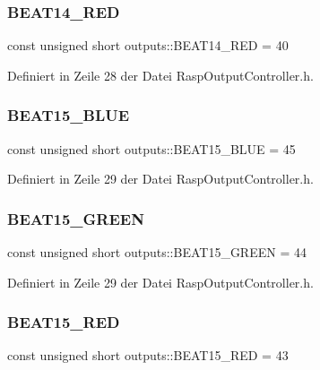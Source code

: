 \subsubsection{\texorpdfstring{B\+E\+A\+T14\+\_\+\+R\+ED}{BEAT14\_RED}}
{\footnotesize\ttfamily const unsigned short outputs\+::\+B\+E\+A\+T14\+\_\+\+R\+ED = 40}



Definiert in Zeile 28 der Datei Rasp\+Output\+Controller.\+h.

\mbox{\label{namespaceoutputs_a6d12c95904da18827ed262896b9ebaa1}} 
\subsubsection{\texorpdfstring{B\+E\+A\+T15\+\_\+\+B\+L\+UE}{BEAT15\_BLUE}}
{\footnotesize\ttfamily const unsigned short outputs\+::\+B\+E\+A\+T15\+\_\+\+B\+L\+UE = 45}



Definiert in Zeile 29 der Datei Rasp\+Output\+Controller.\+h.

\mbox{\label{namespaceoutputs_afacd3fd74ab006d3ce548b672c3ab2f7}} 
\subsubsection{\texorpdfstring{B\+E\+A\+T15\+\_\+\+G\+R\+E\+EN}{BEAT15\_GREEN}}
{\footnotesize\ttfamily const unsigned short outputs\+::\+B\+E\+A\+T15\+\_\+\+G\+R\+E\+EN = 44}



Definiert in Zeile 29 der Datei Rasp\+Output\+Controller.\+h.

\mbox{\label{namespaceoutputs_a6cdbcf8d70f85316af1ea2b96d9b72bd}} 
\subsubsection{\texorpdfstring{B\+E\+A\+T15\+\_\+\+R\+ED}{BEAT15\_RED}}
{\footnotesize\ttfamily const unsigned short outputs\+::\+B\+E\+A\+T15\+\_\+\+R\+ED = 43}



